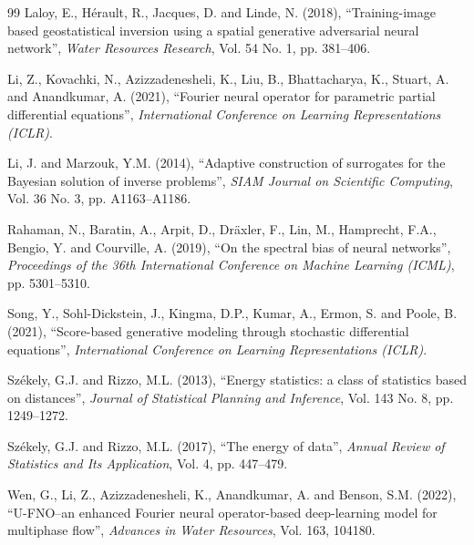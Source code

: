 \documentclass[12pt]{article}
\begin{document}
\begin{thebibliography}{99}
 Laloy, E., H\'erault, R., Jacques, D. and Linde, N. (2018), ``Training-image based geostatistical inversion using a spatial generative adversarial neural network'', \emph{Water Resources Research}, Vol. 54 No. 1, pp. 381--406.

 Li, Z., Kovachki, N., Azizzadenesheli, K., Liu, B., Bhattacharya, K., Stuart, A. and Anandkumar, A. (2021), ``Fourier neural operator for parametric partial differential equations'', \emph{International Conference on Learning Representations (ICLR)}.

 Li, J. and Marzouk, Y.M. (2014), ``Adaptive construction of surrogates for the Bayesian solution of inverse problems'', \emph{SIAM Journal on Scientific Computing}, Vol. 36 No. 3, pp. A1163--A1186.

 Rahaman, N., Baratin, A., Arpit, D., Dr\"axler, F., Lin, M., Hamprecht, F.A., Bengio, Y. and Courville, A. (2019), ``On the spectral bias of neural networks'', \emph{Proceedings of the 36th International Conference on Machine Learning (ICML)}, pp. 5301--5310.

 Song, Y., Sohl-Dickstein, J., Kingma, D.P., Kumar, A., Ermon, S. and Poole, B. (2021), ``Score-based generative modeling through stochastic differential equations'', \emph{International Conference on Learning Representations (ICLR)}.

 Sz\'ekely, G.J. and Rizzo, M.L. (2013), ``Energy statistics: a class of statistics based on distances'', \emph{Journal of Statistical Planning and Inference}, Vol. 143 No. 8, pp. 1249--1272.

 Sz\'ekely, G.J. and Rizzo, M.L. (2017), ``The energy of data'', \emph{Annual Review of Statistics and Its Application}, Vol. 4, pp. 447--479.

 Wen, G., Li, Z., Azizzadenesheli, K., Anandkumar, A. and Benson, S.M. (2022), ``U-FNO--an enhanced Fourier neural operator-based deep-learning model for multiphase flow'', \emph{Advances in Water Resources}, Vol. 163, 104180.

\end{thebibliography}
\end{document}
